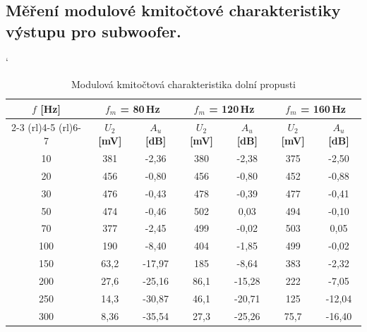 \documentclass[a4paper, czech]{article}
\begin{document}
\subsection{Měření modulové kmitočtové charakteristiky výstupu pro subwoofer.}

\begin{table}[H]
    \catcode`
    \centering
    \caption{Modulová kmitočtová charakteristika dolní propusti}
    \begin{tabular}{ccccccc}
        \toprule
        \multirow{2}{*}{\setstretch{2} $f$ \textbf{[Hz]}} & \multicolumn{2}{c}{$f_m$ = 80\,Hz} & \multicolumn{2}{c}{$f_m$ = 120\,Hz} & \multicolumn{2}{c}{$f_m$ = 160\,Hz} \\
        \cmidrule(rl){2-3}
        \cmidrule(rl){4-5}
        \cmidrule(rl){6-7}
         & $U_2$ \textbf{[mV]} & $A_u$ \textbf{[dB]} & $U_2$ \textbf{[mV]} & $A_u$ \textbf{[dB]} & $U_2$ \textbf{[mV]} & $A_u$ \textbf{[dB]} \\
        \midrule
        10     & 381            & -2,36         & 380            & -2,38          & 375            & -2,50          \\
        20     & 456            & -0,80         & 456            & -0,80          & 452            & -0,88          \\
        30     & 476            & -0,43         & 478            & -0,39          & 477            & -0,41          \\
        50     & 474            & -0,46         & 502            & 0,03           & 494            & -0,10          \\
        70     & 377            & -2,45         & 499            & -0,02          & 503            & 0,05           \\
        100    & 190            & -8,40         & 404            & -1,85          & 499            & -0,02          \\
        150    & 63,2           & -17,97        & 185            & -8,64          & 383            & -2,32          \\
        200    & 27,6           & -25,16        & 86,1           & -15,28         & 222            & -7,05          \\
        250    & 14,3           & -30,87        & 46,1           & -20,71         & 125            & -12,04         \\
        300    & 8,36           & -35,54        & 27,3           & -25,26         & 75,7           & -16,40        \\
        \bottomrule
    \end{tabular}
\end{table}
\end{document}
